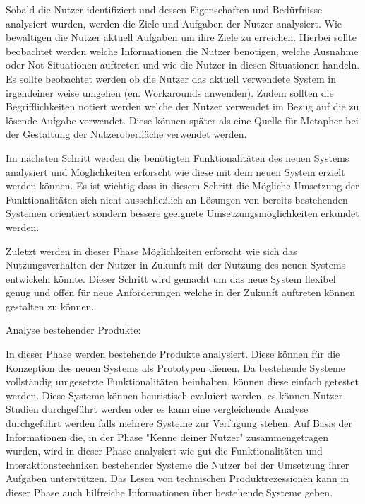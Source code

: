 Sobald die Nutzer identifiziert und dessen Eigenschaften und Bedürfnisse analysiert wurden, werden die Ziele und Aufgaben der Nutzer analysiert. Wie bewältigen die  Nutzer aktuell Aufgaben um 
ihre Ziele zu erreichen. Hierbei sollte beobachtet werden welche Informationen die Nutzer benötigen, welche Ausnahme oder Not Situationen  auftreten und wie die Nutzer in diesen Situationen handeln. 
Es sollte beobachtet werden ob die Nutzer das aktuell verwendete System in irgendeiner  weise umgehen (en. Workarounds anwenden). Zudem sollten die Begrifflichkeiten notiert werden welche der 
Nutzer verwendet im Bezug auf die zu lösende Aufgabe verwendet.  Diese können später als eine Quelle für Metapher bei der Gestaltung der Nutzeroberfläche verwendet werden. 

Im nächsten Schritt werden die benötigten Funktionalitäten des neuen Systems analysiert und Möglichkeiten erforscht wie diese mit dem neuen System erzielt werden können. 
Es ist wichtig dass in diesem Schritt die Mögliche Umsetzung der Funktionalitäten sich nicht ausschließlich an Lösungen von bereits bestehenden Systemen orientiert sondern 
bessere geeignete Umsetzungsmöglichkeiten erkundet werden.

Zuletzt werden in dieser Phase Möglichkeiten erforscht wie sich das Nutzungsverhalten der Nutzer in Zukunft mit der Nutzung des neuen Systems entwickeln könnte. Dieser Schritt wird  
gemacht um das neue System flexibel genug und offen für neue Anforderungen welche in der Zukunft auftreten können gestalten zu können.

Analyse bestehender Produkte: 

In dieser Phase werden bestehende Produkte analysiert. Diese können für die Konzeption des neuen Systems als Prototypen dienen. Da bestehende Systeme vollständig 
umgesetzte Funktionalitäten beinhalten, können diese einfach getestet werden.    
Diese Systeme können heuristisch evaluiert werden, es können Nutzer Studien durchgeführt werden oder es kann eine vergleichende Analyse durchgeführt werden falls mehrere Systeme zur 
Verfügung stehen. Auf Basis der Informationen die, in der Phase "Kenne deiner Nutzer" zusammengetragen wurden, wird in dieser Phase analysiert wie gut die  Funktionalitäten und Interaktionstechniken 
bestehender Systeme die Nutzer bei der Umsetzung ihrer Aufgaben unterstützen. Das Lesen von technischen Produktrezessionen kann in dieser Phase auch hilfreiche Informationen über bestehende Systeme geben. 

